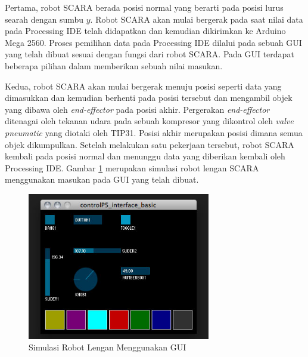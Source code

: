 Pertama, robot SCARA berada posisi normal yang berarti pada posisi lurus searah dengan sumbu $y$. Robot SCARA akan mulai bergerak pada saat nilai data pada Processing IDE telah didapatkan dan kemudian dikirimkan ke Arduino Mega 2560. Proses pemilihan data pada Processing IDE dilalui pada sebuah GUI yang telah dibuat sesuai dengan fungsi dari robot SCARA. Pada GUI terdapat beberapa pilihan dalam memberikan sebuah nilai masukan. 

Kedua, robot SCARA akan mulai bergerak menuju posisi seperti data yang dimasukkan dan kemudian berhenti pada posisi tersebut dan mengambil objek yang dibawa oleh \textit{end-effector} pada posisi akhir.  Pergerakan \textit{end-effector} ditenagai oleh tekanan udara pada sebuah kompresor yang dikontrol oleh\textit{ valve pneumatic} yang diotaki oleh TIP31. Posisi akhir merupakan posisi dimana semua objek dikumpulkan. Setelah melakukan satu pekerjaan tersebut, robot SCARA kembali pada posisi normal dan menunggu data yang diberikan kembali oleh Processing IDE.  Gambar \ref{pic.simulasiakhir} merupakan simulasi robot lengan SCARA menggunakan masukan pada GUI yang telah dibuat.
 \begin{figure}[H]
 	\centering
 	\includegraphics[width=8cm]{gambar/controlp5.jpg}
 	\caption{Simulasi Robot Lengan Menggunakan GUI }
 	\label{pic.simulasiakhir}
 \end{figure}




